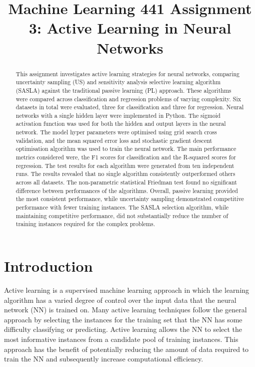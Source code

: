 \documentclass[conference]{IEEEtran}
\begin{document}
	
	\title{Machine Learning 441 Assignment 3: Active Learning in Neural Networks}
	\author{
	}
	\maketitle
	
	\begin{abstract}
	This assignment investigates active learning strategies for neural networks, comparing uncertainty sampling (US) and sensitivity analysis selective learning algorithm (SASLA) against the traditional passive learning (PL) approach. These algorithms were compared across classification and regression problems of varying complexity. Six datasets in total were evaluated, three for classification and three for regression. Neural networks with a single hidden layer were implemented in Python. The sigmoid activation function was used for both the hidden and output layers in the neural network. The model hyper parameters were optimised using grid search cross validation, and the mean squared error loss and stochastic gradient descent optimisation algorithm was used to train the neural network. The main performance metrics considered were, the F1 scores for classification and the R-squared scores for regression. The test results for each algorithm were generated from ten independent runs. The results revealed that no single algorithm consistently outperformed others across all datasets. The non-parametric statistical Friedman test found no significant difference between performances of the algorithms. Overall, passive learning provided the most consistent performance, while uncertainty sampling demonstrated competitive performance with fewer training instances. The SASLA selection algorithm, while maintaining competitive performance, did not substantially reduce the number of training instances required for the complex problems.
	\end{abstract}
	
	\section{Introduction}
	Active learning is a supervised machine learning approach in which the learning algorithm has a varied degree of control over the input data that the neural network (NN) is trained on. Many active learning techniques follow the general approach by selecting the instances for the training set that the NN has some difficulty classifying or predicting. Active learning allows the NN to select the most informative instances from a candidate pool of training instances. This approach has the benefit of potentially reducing the amount of data required to train the NN and subsequently increase computational efficiency.
	
\end{document}
